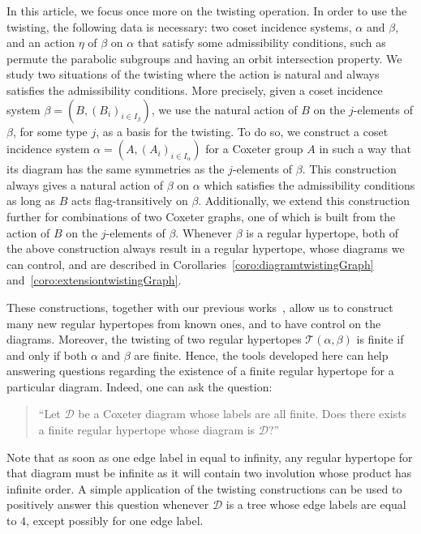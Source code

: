 \documentclass[11pt,letterpaper]{amsart}
\newcommand{\TT}{\mathcal{T}}
\begin{document}
In this article, we focus once more on the twisting operation. In order to use the twisting, the following data is necessary: two coset incidence systems, $\alpha$ and $\beta$, and an action $\eta$ of $\beta$ on $\alpha$ that satisfy some admissibility conditions, such as permute the parabolic subgroups and having an orbit intersection property.
We study two situations of the twisting where the action is natural and always satisfies the admissibility conditions. More precisely, given a coset incidence system $\beta = (B,(B_i)_{i\in I_\beta})$, we use the natural action of $B$ on the $j$-elements of $\beta$, for some type $j$, as a basis for the twisting. To do so, we construct a coset incidence system $\alpha= (A,(A_i)_{i\in I_\alpha})$ for a Coxeter group $A$ in such a way that its diagram has the same symmetries as the $j$-elements of $\beta$.
This construction always gives a natural action of $\beta$ on $\alpha$ which satisfies the admissibility conditions as long as $B$ acts flag-transitively on $\beta$.
Additionally, we extend this construction further for combinations of two Coxeter graphs, one of which is built from the action of $B$ on the $j$-elements of $\beta$.
Whenever $\beta$ is a regular hypertope, both of the above construction always result in a regular hypertope, whose diagrams we can control, and are described in Corollaries~\ref{coro:diagramtwistingGraph} and~\ref{coro:extensiontwistingGraph}.

These constructions, together with our previous works~\cite{PiedadeTranchida_FromGroupOps2026,wreath,halving}, allow us to construct many new regular hypertopes from known ones, and to have control on the diagrams. Moreover, the twisting of two regular hypertopes $\TT(\alpha,\beta)$ is finite if and only if both $\alpha$ and $\beta$ are finite. Hence, the tools developed here can help answering questions regarding the existence of a finite regular hypertope for a particular diagram. Indeed, one can ask the question: 
\begin{quote}
    ``Let $\mathcal{D}$ be a Coxeter diagram whose labels are all finite. Does there exists a finite regular hypertope whose diagram is $\mathcal{D}$?''
\end{quote}
Note that as soon as one edge label in equal to infinity, any regular hypertope for that diagram must be infinite as it will contain two involution whose product has infinite order.
A simple application of the twisting constructions can be used to positively answer this question whenever $\mathcal{D}$ is a tree whose edge labels are equal to $4$, except possibly for one edge label.
\end{document}
